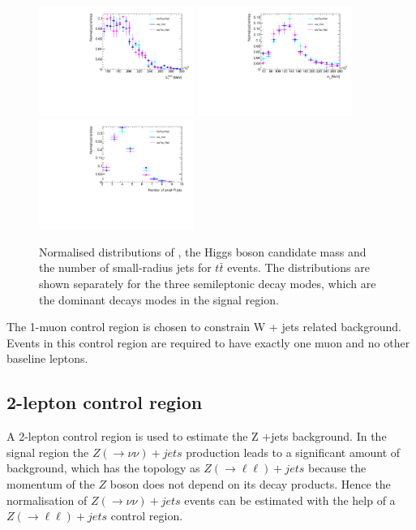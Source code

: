 \begin{figure}[h]
    \centering
    \includegraphics[width=0.45\textwidth]{chapters/c7/figures/ttbar_MetTST_met.pdf}
    \includegraphics[width=0.45\textwidth]{chapters/c7/figures/ttbar_m_jj.pdf}
    \includegraphics[width=0.45\textwidth]{chapters/c7/figures/ttbar_N_Jets04.pdf}      
    \caption{Normalised distributions of \met, the Higgs boson candidate mass and the number of small-radius jets for $t\bar{t}$ events. The distributions are shown separately for the three semileptonic decay modes, which are the dominant decays modes in the signal region.}
    \label{fig:ttbarDecayCatKinematic}
\end{figure}

\par The 1-muon control region is chosen to constrain W + jets related background. Events in this control region are required to have exactly one muon and no other baseline leptons.

\subsection{2-lepton control region}
\par A 2-lepton control region is used to estimate the Z +jets background. 
In the signal region the $Z(\to\nu\nu)+jets$ production leads to a significant amount of background, which has the topology as $Z(\to\ell\ell)+jets$ because the momentum of the $Z$ boson does not depend on its decay products. 
Hence the normalisation of $Z(\to\nu\nu)+jets$ events can be estimated with the help of a $Z(\to\ell\ell)+jets$ control region.

